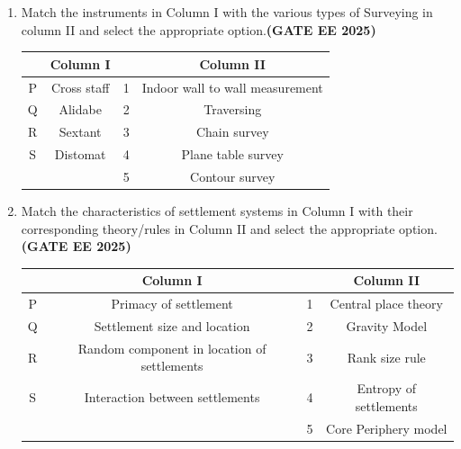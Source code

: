 \documentclass[journal,12pt,onecolumn]{IEEEtran}
\theoremstyle{remark}
\begin{document}
\begin{enumerate}
\item Match the instruments in Column I with the various types of Surveying in column II and select the appropriate option.\hfill \textbf{(GATE EE 2025)}\\
\begin{tabular}{|c|c|c|c|} \hline
  &Column I   &   & Column II \\ \hline
 P & Cross staff    & 1 & Indoor wall to wall measurement\\ \hline
 Q & Alidabe   & 2 & Traversing\\ \hline
 R & Sextant  & 3 & Chain survey \\ \hline
 S & Distomat & 4 & Plane table survey\\ \hline
    &        & 5 & Contour survey\\ \hline
\end{tabular}
\begin{enumerate}
\end{enumerate}
\item Match the characteristics of settlement systems in Column I with their corresponding theory/rules in Column II and select the appropriate option.\hfill \textbf{(GATE EE 2025)}\\
\begin{tabular}{|c|c|c|c|} \hline
 & Column I & & Column II \\ \hline
P & Primacy of settlement  &1 & Central place theory  \\ \hline
Q & Settlement size and location & 2 & Gravity Model\\ \hline
R & Random component in location of settlements & 3 & Rank size rule\\ \hline
S & Interaction between settlements & 4 & Entropy of settlements\\ \hline
 & & 5 & Core Periphery model\\ \hline
\end{tabular}
\begin{enumerate}
\end{enumerate}
\end{enumerate}
\end{document}
